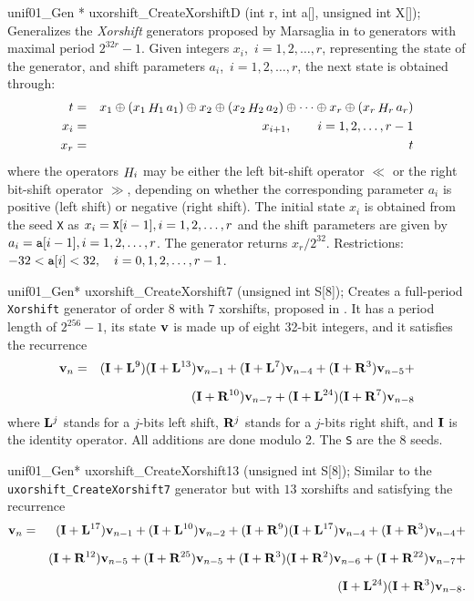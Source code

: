 unif01_Gen * uxorshift_CreateXorshiftD (int r, int a[], unsigned int X[]);
\endcode
 \tab Generalizes the {\it Xorshift} generators
  proposed by Marsaglia in \cite[page 5]{rMAR03a} to generators
  with maximal period  $2^{32r} - 1$.
  Given integers $x_i$,\  $i = 1,2,\ldots, r$,
   representing the state of the generator, and shift parameters
   $a_i$,\  $i = 1,2,\ldots, r$, the next
  state is obtained through:
  \begin {eqnarray*}
    t  &= & x_1 \oplus (x_1 \mathop {H}\nolimits_1 a_1) \oplus x_2 \oplus (x_2 \mathop {H}\nolimits_2 a_2)
   \oplus \cdots  \oplus x_r \oplus (x_r \mathop {H}\nolimits_r a_r)  \\
    x_i &=& x_{i+1}, \qquad i = 1,2,\ldots, r-1 \\
    x_r   &=& t
  \end {eqnarray*}
   where the operators $\mathop {H}\nolimits_i$ may be either
   the left bit-shift  operator $\ll$ or the right bit-shift operator $\gg$,
   depending on whether the corresponding parameter $a_i$
   is positive (left shift) or  negative (right shift).
   The initial state $x_i$ is obtained from the seed {\tt X}  as
    $x_i = {\tt X} [i - 1],   i = 1,2,\ldots, r$ and the shift parameters are
   given by $a_i = {\tt a}[i - 1],   i = 1,2,\ldots, r$.
   The generator returns $x_{r}/2^{32}$.
   Restrictions: $-32 < {\tt a}[i] < 32, \quad i = 0, 1,2,\ldots, r-1 $.
  \endtab
\code


unif01_Gen* uxorshift_CreateXorshift7 (unsigned int S[8]);
\endcode
  \tab Creates a full-period \texttt{Xorshift} generator%
  of  order $8$ with $7$ xorshifts, proposed in \cite{rPAN04c}.
  It has a period length of
  $2^{256}-1$, its state ${\bf v}$ is made up of eight 32-bit integers, and it
   satisfies the recurrence
\begin{eqnarray*}
{\bf v}_{n} &=& ({\bf I} + {\bf L}^9)({\bf I} + {\bf L}^{13}){\bf v}_{n-1}
+ ({\bf I}+{\bf L}^{7}){\bf v}_{n-4}  + ({\bf I}+{\bf R}^{3}){\bf v}_{n-5} + \\[6pt]
 &&  ({\bf I}+{\bf R}^{10}){\bf v}_{n-7} +
({\bf I}+{\bf L}^{24})({\bf I}+{\bf R}^{7}){\bf v}_{n-8}
\end{eqnarray*}
 where ${\bf L}^j$ stands for a $j$-bits left shift, ${\bf R}^j$ stands for
  a $j$-bits right shift, and ${\bf I}$ is the identity operator. All additions
are done modulo 2.
 The \texttt{S} are the 8 seeds.
 \endtab
\code


unif01_Gen* uxorshift_CreateXorshift13 (unsigned int S[8]);
\endcode
  \tab Similar to the \texttt{uxorshift\_CreateXorshift7} generator
  \cite{rPAN04c}%
  but  with $13$ xorshifts and  satisfying the recurrence
\begin{eqnarray*}
{\bf v}_{n} &=& ({\bf I}+{\bf L}^{17}){\bf v}_{n-1}
+({\bf I}+{\bf L}^{10}){\bf v}_{n-2}
+({\bf I}+{\bf R}^{9})({\bf I}+{\bf L}^{17}){\bf v}_{n-4}
+ ({\bf I}+{\bf R}^{3}){\bf v}_{n-4} + \\[6pt]
 &&  ({\bf I}+{\bf R}^{12}){\bf v}_{n-5}
+ ({\bf I}+{\bf R}^{25}){\bf v}_{n-5}
+  ({\bf I}+{\bf R}^{3})({\bf I}+{\bf R}^{2}){\bf v}_{n-6}
+({\bf I}+{\bf R}^{22}){\bf v}_{n-7} + \\[6pt]
 && ({\bf I}+{\bf L}^{24})({\bf I}+{\bf R}^{3}){\bf v}_{n-8}.
\end{eqnarray*}
 \endtab


